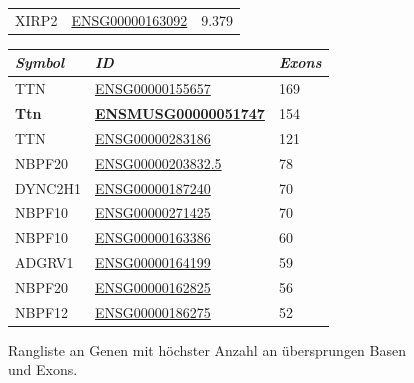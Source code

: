 \documentclass[12pt]{article}
\begin{document}
\begin{figure}[htbp]
\begin{minipage}{0.45\textwidth}
\begin{tabular}{l|l|l}
			XIRP2                    & \href{https://asia.ensembl.org/Homo_sapiens/Gene/Summary?db=core;g=ENSG00000163092;r=2:166888480-167259753}{ENSG00000163092}              & 9.379                    \\
		\end{tabular}
	\end{minipage}
	\hfill
	\begin{minipage}{0.45\textwidth}
		\centering
		\begin{tabular}{l|l|l}
			\textit{\textbf{Symbol}} & \textit{\textbf{ID}}                                                                                                          & \textit{\textbf{Exons}} \\\hline
		TTN                      & \href{https://asia.ensembl.org/Homo_sapiens/Gene/Summary?db=core;g=ENSG00000155657;r=2:178525989-178830802}{ENSG00000155657}              & 169                     \\
		\textbf{Ttn}             & \href{https://asia.ensembl.org/Mus_musculus/Gene/Summary?db=core;g=ENSMUSG00000051747;r=2:76534324-76812891}{\textbf{ENSMUSG00000051747}} & 154                     \\
		TTN                      & \href{https://asia.ensembl.org/Homo_sapiens/Gene/Idhistory?g=ENSG00000283186}{ENSG00000283186}                                            & 121                     \\
		NBPF20                   & \href{https://asia.ensembl.org/Homo_sapiens/Gene/Idhistory?g=ENSG00000203832}{ENSG00000203832.5}                                          & 78                      \\
		DYNC2H1                  & \href{https://asia.ensembl.org/Homo_sapiens/Gene/Summary?db=core;g=ENSG00000187240;r=11:103109410-103479863}{ENSG00000187240}             & 70                      \\
		NBPF10                   & \href{https://asia.ensembl.org/Homo_sapiens/Gene/Summary?db=core;g=ENSG00000271425;r=1:146064711-146229000}{ENSG00000271425}              & 70                      \\
		NBPF10	& \href{https://asia.ensembl.org/Homo_sapiens/Gene/Idhistory?g=ENSG00000163386}{ENSG00000163386}	& 60\\
		ADGRV1	& \href{https://asia.ensembl.org/Homo_sapiens/Gene/Summary?db=core;g=ENSG00000164199;r=5:90529344-91164437}{ENSG00000164199}	&59\\
		NBPF20	& \href{https://asia.ensembl.org/Homo_sapiens/Gene/Summary?db=core;g=ENSG00000162825;r=1:145289900-145425603}{ENSG00000162825}	&56\\
		NBPF12	& \href{https://asia.ensembl.org/Homo_sapiens/Gene/Idhistory?g=ENSG00000186275}{ENSG00000186275}	&52 \\
		\end{tabular}
	\end{minipage}
	\caption{Rangliste an Genen mit höchster Anzahl an übersprungen Basen und Exons.}\label{tab:top}
\end{figure}
\end{document}
